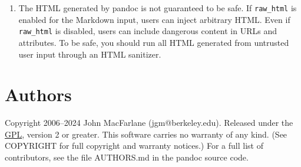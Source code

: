\documentclass[
]{article}
\begin{document}
\begin{enumerate}
  pandoc executable, you can add the command line options
  \texttt{+RTS\ -M512M\ -RTS} (for example) to limit the heap size to
  512MB. Note that the \texttt{commonmark} parser (including
  \texttt{commonmark\_x} and \texttt{gfm}) is much less vulnerable to
  pathological performance than the \texttt{markdown} parser, so it is a
  better choice when processing untrusted input.
\item
  The HTML generated by pandoc is not guaranteed to be safe. If
  \texttt{raw\_html} is enabled for the Markdown input, users can inject
  arbitrary HTML. Even if \texttt{raw\_html} is disabled, users can
  include dangerous content in URLs and attributes. To be safe, you
  should run all HTML generated from untrusted user input through an
  HTML sanitizer.
\end{enumerate}

\hypertarget{authors}{%
\section{Authors}\label{authors}}

Copyright 2006--2024 John MacFarlane (jgm@berkeley.edu). Released under
the \href{https://www.gnu.org/copyleft/gpl.html}{GPL}, version 2 or
greater. This software carries no warranty of any kind. (See COPYRIGHT
for full copyright and warranty notices.) For a full list of
contributors, see the file AUTHORS.md in the pandoc source code.
\end{document}
